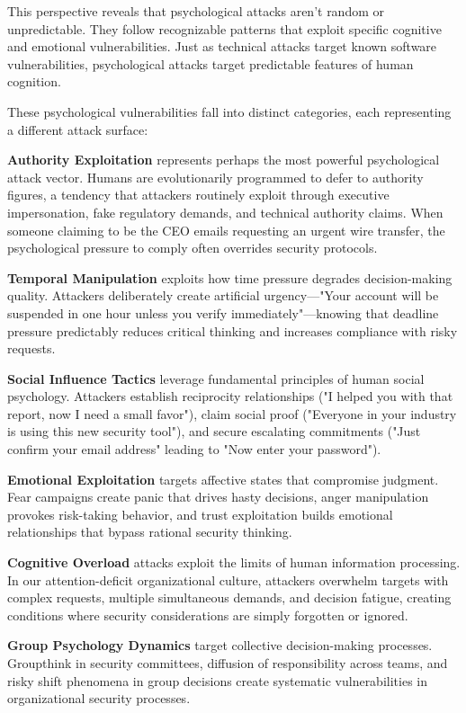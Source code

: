 \documentclass[10pt, twocolumn]{article}
\begin{document}
This perspective reveals that psychological attacks aren't random or unpredictable. They follow recognizable patterns that exploit specific cognitive and emotional vulnerabilities. Just as technical attacks target known software vulnerabilities, psychological attacks target predictable features of human cognition.

These psychological vulnerabilities fall into distinct categories, each representing a different attack surface:

\textbf{Authority Exploitation} represents perhaps the most powerful psychological attack vector. Humans are evolutionarily programmed to defer to authority figures, a tendency that attackers routinely exploit through executive impersonation, fake regulatory demands, and technical authority claims. When someone claiming to be the CEO emails requesting an urgent wire transfer, the psychological pressure to comply often overrides security protocols.

\textbf{Temporal Manipulation} exploits how time pressure degrades decision-making quality. Attackers deliberately create artificial urgency—"Your account will be suspended in one hour unless you verify immediately"—knowing that deadline pressure predictably reduces critical thinking and increases compliance with risky requests.

\textbf{Social Influence Tactics} leverage fundamental principles of human social psychology. Attackers establish reciprocity relationships ("I helped you with that report, now I need a small favor"), claim social proof ("Everyone in your industry is using this new security tool"), and secure escalating commitments ("Just confirm your email address" leading to "Now enter your password").

\textbf{Emotional Exploitation} targets affective states that compromise judgment. Fear campaigns create panic that drives hasty decisions, anger manipulation provokes risk-taking behavior, and trust exploitation builds emotional relationships that bypass rational security thinking.

\textbf{Cognitive Overload} attacks exploit the limits of human information processing. In our attention-deficit organizational culture, attackers overwhelm targets with complex requests, multiple simultaneous demands, and decision fatigue, creating conditions where security considerations are simply forgotten or ignored.

\textbf{Group Psychology Dynamics} target collective decision-making processes. Groupthink in security committees, diffusion of responsibility across teams, and risky shift phenomena in group decisions create systematic vulnerabilities in organizational security processes.
\end{document}
